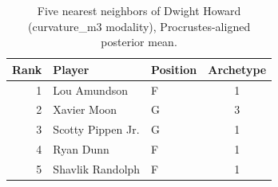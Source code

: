 \begin{table}[htbp]
  \centering\small
  \begin{tabular}{rllc}
    \toprule
    Rank & Player & Position & Archetype \\
    \midrule
    1 & Lou Amundson & F & 1 \\
    2 & Xavier Moon & G & 3 \\
    3 & Scotty Pippen Jr. & G & 1 \\
    4 & Ryan Dunn & F & 1 \\
    5 & Shavlik Randolph & F & 1 \\
    \bottomrule
  \end{tabular}
  \caption{Five nearest neighbors of Dwight Howard (curvature_m3 modality), Procrustes-aligned posterior mean.}
  \label{tab:Dwight_Howard_neighbors_curvature_m3}
\end{table}

